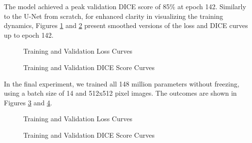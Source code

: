 The model achieved a peak validation DICE score of 85\% at epoch 142. Similarly to the U-Net from scratch, 
for enhanced clarity in visualizing the training dynamics, Figures \ref{fig:renet50_frozen_loss_curve_smooth} and 
\ref{fig:renet50_frozen_dice_curve_smooth} present smoothed versions of the loss and DICE curves up to epoch 142.

\begin{figure}[ht]
    \centering
    \caption{Training and Validation Loss Curves}
    \label{fig:renet50_frozen_loss_curve_smooth}
\end{figure}

\begin{figure}[ht]
    \centering
    \caption{Training and Validation DICE Score Curves}
    \label{fig:renet50_frozen_dice_curve_smooth}
\end{figure}

In the final experiment, we trained all 148 million parameters without freezing, using a batch size of 14 and 512x512 pixel images. The outcomes are shown in Figures \ref{fig:renet50_unfrozen_loss_curve} and \ref{fig:renet50_unfrozen_dice_curve}.


\begin{figure}[ht]
    \centering
    \caption{Training and Validation Loss Curves}
    \label{fig:renet50_unfrozen_loss_curve}
\end{figure}

\begin{figure}[ht]
    \centering
    \caption{Training and Validation DICE Score Curves}
    \label{fig:renet50_unfrozen_dice_curve}
\end{figure}

